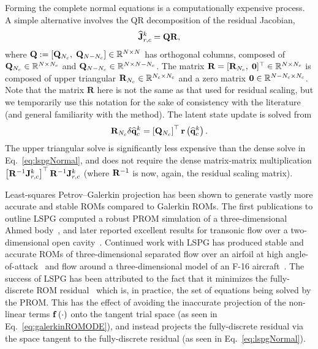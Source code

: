 Forming the complete normal equations is a computationally expensive process. A simple alternative involves the QR decomposition of the residual Jacobian,
%
\begin{equation}
    \mathbf{\widehat{J}}_{r,c}^{k} = \mathbf{QR},
\end{equation}
%
where $\mathbf{Q} := \left[\mathbf{Q}_{N_c}, \; \mathbf{Q}_{N-N_c}\right] \in \mathbb{R}^{N \times N}$ has orthogonal columns, composed of $\mathbf{Q}_{N_c} \in \mathbb{R}^{N \times N_c}$ and $\mathbf{Q}_{N - N_c} \in \mathbb{R}^{N \times N - N_c}$. The matrix $\mathbf{R} = [\mathbf{R}_{N_c}, \; \mathbf{0}]^\top \in \mathbb{R}^{N \times N_c}$ is composed of upper triangular $\mathbf{R}_{N_c} \in \mathbb{R}^{N_c \times N_c}$ and a zero matrix $\mathbf{0} \in \mathbb{R}^{N - N_c \times N_c}$. Note that the matrix $\mathbf{R}$ here is not the same as that used for residual scaling, but we temporarily use this notation for the sake of consistency with the literature (and general familiarity with the method). The latent state update is solved from
%
\begin{equation}
    \mathbf{R}_{N_c} \delta \mathbf{\widehat{q}}_{c}^{k} = \left[\mathbf{Q}_{N_c}\right]^\top \mathbf{r}\left(\mathbf{\widehat{q}}_{c}^{k}\right).
\end{equation}
%
The upper triangular solve is significantly less expensive than the dense solve in Eq.~\ref{eq:lspgNormal}, and does not require the dense matrix-matrix multiplication $\left[\resScaleInv \jacobResCons^{\newtonIdx}\right]^\top \resScaleInv \jacobResCons^{\newtonIdx}$ (where $\resScaleInv$ is now, again, the residual scaling matrix).

Least-squares Petrov--Galerkin projection has been shown to generate vastly more accurate and stable ROMs compared to Galerkin ROMs. The first publications to outline LSPG computed a robust PROM simulation of a three-dimensional Ahmed body~\cite{Carlberg2010,Carlberg2013}, and later reported excellent results for transonic flow over a two-dimensional open cavity~\cite{Carlberg2017}. Continued work with LSPG has produced stable and accurate ROMs of three-dimensional separated flow over an airfoil at high angle-of-attack~\cite{Grimberg2020Hyper} and flow around a three-dimensional model of an F-16 aircraft~\cite{Grimberg2021}. The success of LSPG has been attributed to the fact that it minimizes the fully-discrete ROM residual~\cite{Grimberg2020} which is, in practice, the set of equations being solved by the PROM. This has the effect of avoiding the inaccurate projection of the non-linear terms $\mathbf{f} \left(\cdot\right)$ onto the tangent trial space (as seen in Eq.~\ref{eq:galerkinROMODE}), and instead projects the fully-discrete residual via the space tangent to the fully-discrete residual (as seen in Eq.~\ref{eq:lspgNormal}).

